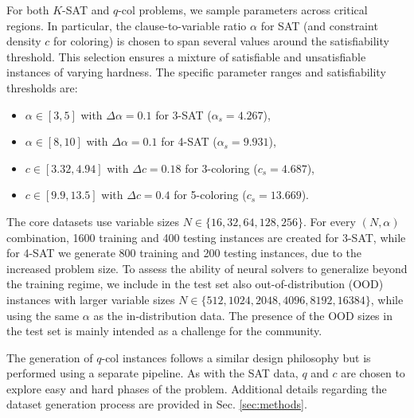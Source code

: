 \documentclass{article}
\begin{document}
For both $K$-SAT and $q$-col problems, we sample parameters across critical regions. In particular, the clause-to-variable ratio $\alpha$ for SAT (and constraint density $c$ for coloring) is chosen to span several values around the satisfiability threshold. This selection ensures a mixture of satisfiable and unsatisfiable instances of varying hardness. The specific parameter ranges and satisfiability thresholds are:
\begin{itemize}
    \item $\alpha \in [3, 5]$ with $\Delta\alpha = 0.1$ for 3-SAT ($\alpha_s=4.267$),
    \item $\alpha \in [8, 10]$ with $\Delta\alpha = 0.1$ for 4-SAT ($\alpha_s=9.931$),
    \item $c \in [3.32, 4.94]$ with $\Delta c = 0.18$ for 3-coloring ($c_s=4.687$),
    \item $c \in [9.9, 13.5]$ with $\Delta c = 0.4$ for 5-coloring ($c_s=13.669$).
\end{itemize}

The core datasets use variable sizes $N \in \{16, 32, 64, 128, 256\}$. For every $(N, \alpha)$ combination, 1600 training and 400 testing instances are created for 3-SAT, while for 4-SAT we generate 800 training and 200 testing instances, due to the increased problem size.  To assess the ability of neural solvers to generalize beyond the training regime, we include in the test set also out-of-distribution (OOD) instances with larger variable sizes $N \in \{512, 1024, 2048, 4096, 8192, 16384\}$, while using the same $\alpha$ as the in-distribution data. The presence of the OOD sizes in the test set is mainly intended as a challenge for the community.

The generation of $q$-col instances follows a similar design philosophy but is performed using a separate pipeline. As with the SAT data, $q$ and $c$ are chosen to explore easy and hard phases of the problem. 
Additional details regarding the dataset generation process are provided in Sec. \ref{sec:methods}.
\end{document}
